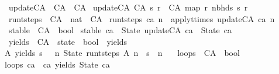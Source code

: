 \begin{isabellebody}
\isanewline
{}\isamarkupfalse%
\ update{\isacharunderscore}CA\ {\isacharcolon}{\isacharcolon}\ {\isachardoublequoteopen}CA\ {\isasymRightarrow}\ CA{\isachardoublequoteclose}\ \isanewline
{\isachardoublequoteopen}update{\isacharunderscore}CA\ {\isacharparenleft}CA\ s\ r{\isacharparenright}\ {\isacharequal}\ CA\ {\isacharparenleft}map\ r\ {\isacharparenleft}nbhds\ s{\isacharparenright}{\isacharparenright}\ r{\isachardoublequoteclose}\isanewline
\isanewline
{}\isamarkupfalse%
\ run{\isacharunderscore}t{\isacharunderscore}steps\ {\isacharcolon}{\isacharcolon}\ {\isachardoublequoteopen}CA\ {\isasymRightarrow}\ nat\ {\isasymRightarrow}\ CA{\isachardoublequoteclose}\ \isanewline
{\isachardoublequoteopen}run{\isacharunderscore}t{\isacharunderscore}steps\ ca\ n\ {\isacharequal}\ apply{\isacharunderscore}t{\isacharunderscore}times\ update{\isacharunderscore}CA\ ca\ n{\isachardoublequoteclose}%
\isadelimdocument
%
\endisadelimdocument
%
\isatagdocument
%
\isamarkuptrue%
%
\endisatagdocument
{\isafolddocument}%
%
\isadelimdocument
%
\endisadelimdocument
{}\isamarkupfalse%
\ stable\ {\isacharcolon}{\isacharcolon}\ {\isachardoublequoteopen}CA\ {\isasymRightarrow}\ bool{\isachardoublequoteclose}\ \isanewline
{\isachardoublequoteopen}stable\ ca\ {\isasymequiv}\ State\ {\isacharparenleft}update{\isacharunderscore}CA\ ca{\isacharparenright}\ {\isacharequal}\ State\ ca{\isachardoublequoteclose}\isanewline
\isanewline
{}\isamarkupfalse%
\ yields\ {\isacharcolon}{\isacharcolon}\ {\isachardoublequoteopen}CA\ {\isasymRightarrow}\ state\ {\isasymRightarrow}\ bool{\isachardoublequoteclose}\ {\isacharparenleft}\ {\isacartoucheopen}yields{\isacartoucheclose}\ \ {}{}{\isacharparenright}\ \isanewline
{\isachardoublequoteopen}A\ yields\ s\ {\isasymequiv}\ {\isacharparenleft}{\isasymexists}\ n{\isachardot}\ State\ {\isacharparenleft}run{\isacharunderscore}t{\isacharunderscore}steps\ A\ n{\isacharparenright}\ {\isacharequal}\ s\ {\isasymand}\ n\ {\isachargreater}\ {}{\isacharparenright}{\isachardoublequoteclose}\isanewline
\isanewline
{}\isamarkupfalse%
\ loops\ {\isacharcolon}{\isacharcolon}\ {\isachardoublequoteopen}CA\ {\isasymRightarrow}\ bool{\isachardoublequoteclose}\ \isanewline
{\isachardoublequoteopen}loops\ ca\ {\isasymequiv}\ ca\ yields\ State\ ca{\isachardoublequoteclose}\isanewline
\isanewline
\isanewline
\isanewline

\end{isabellebody}
